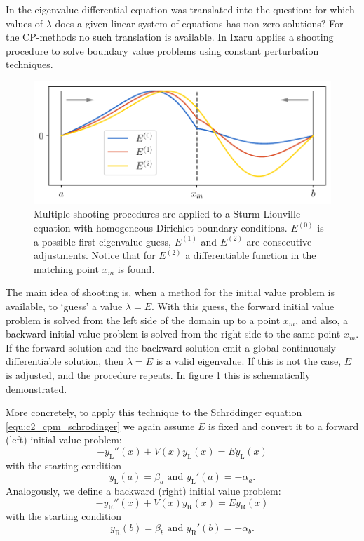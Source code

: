 In \cite{canosa_new_1970} the eigenvalue differential equation was translated into the question: for which values of $\lambda$ does a given linear system of equations has non-zero solutions? For the CP-methods no such translation is available. In \cite{ixaru_numerical_1984} Ixaru applies a shooting procedure to solve boundary value problems using constant perturbation techniques.

\begin{figure}
    \begin{center}
        \includegraphics[width=\linewidth]{img/chapter2/shooting_schematic.pdf}
        \caption{Multiple shooting procedures are applied to a Sturm-Liouville equation with homogeneous Dirichlet boundary conditions. $E^{(0)}$ is a possible first eigenvalue guess, $E^{(1)}$ and $E^{(2)}$ are consecutive adjustments. Notice that for $E^{(2)}$ a differentiable function in the matching point $x_m$ is found.}
        \label{fig:c2_shooting_schematic}
    \end{center}
\end{figure}

The main idea of shooting is, when a method for the initial value problem is available, to `guess' a value $\lambda = E$. With this guess, the forward initial value problem is solved from the left side of the domain up to a point $x_m$, and also, a backward initial value problem is solved from the right side to the same point $x_m$. If the forward solution and the backward solution emit a global continuously differentiable solution, then $\lambda = E$ is a valid eigenvalue. If this is not the case, $E$ is adjusted, and the procedure repeats. In figure \ref{fig:c2_shooting_schematic} this is schematically demonstrated.

More concretely, to apply this technique to the Schrödinger equation \eqref{equ:c2_cpm_schrodinger} we again assume $E$ is fixed and convert it to a forward (left) initial value problem:
$$
    -y_\text{L}''(x) + V(x) y_\text{L}(x) = E y_\text{L}(x)
$$
with the starting condition
$$
    y_\text{L}(a) = \beta_a \text{ and } y_\text{L}'(a) = -\alpha_a\text{.}
$$
Analogously, we define a backward (right) initial value problem:
$$
    -y_\text{R}''(x) + V(x) y_\text{R}(x) = E y_\text{R}(x)
$$
with the starting condition
$$
    y_\text{R}(b) = \beta_b \text{ and } y_\text{R}'(b) = -\alpha_b\text{.}
$$

